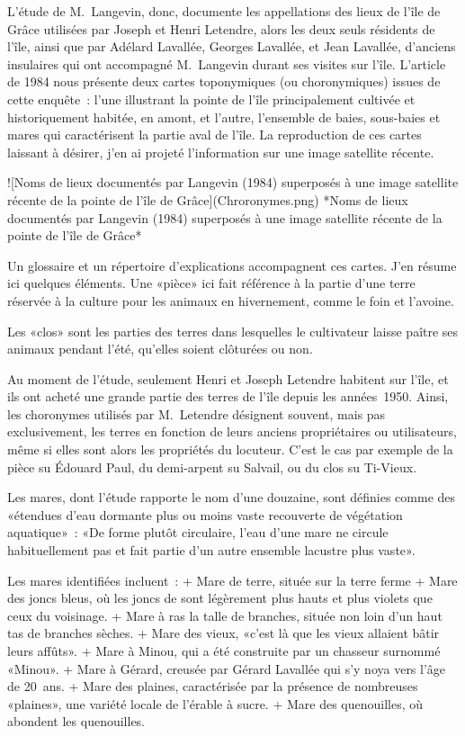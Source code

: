 \documentclass[12pt]{report}
\begin{document}
L’étude de M. Langevin, donc, documente les appellations des lieux de l’île de Grâce utilisées par Joseph et Henri Letendre, alors les deux seuls résidents de l’île, ainsi que par Adélard Lavallée, Georges Lavallée, et Jean Lavallée, d’anciens insulaires qui ont accompagné M. Langevin durant ses visites sur l’île. L’article de 1984 nous présente deux cartes toponymiques (ou choronymiques) issues de cette enquête : l’une illustrant la pointe de l’île principalement cultivée et historiquement habitée, en amont, et l’autre, l’ensemble de baies, sous-baies et mares qui caractérisent la partie aval de l’île. La reproduction de ces cartes laissant à désirer, j’en ai projeté l’information sur une image satellite récente.  


![Noms de lieux documentés par Langevin (1984) superposés à une image satellite récente de la pointe de l’île de Grâce](Chroronymes.png)  
*Noms de lieux documentés par Langevin (1984) superposés à une image satellite récente de la pointe de l’île de Grâce* 

Un glossaire et un répertoire d’explications accompagnent ces cartes. J’en résume ici quelques éléments.  
Une «pièce» ici fait référence à la partie d’une terre réservée à la culture pour les animaux en hivernement, comme le foin et l’avoine.  

Les «clos» sont les parties des terres dans lesquelles le cultivateur laisse paître ses animaux pendant l’été, qu’elles soient clôturées ou non.  

Au moment de l’étude, seulement Henri et Joseph Letendre habitent sur l’île, et ils ont acheté une grande partie des terres de l’île depuis les années 1950. Ainsi, les choronymes utilisés par M. Letendre désignent souvent, mais pas exclusivement, les terres en fonction de leurs anciens propriétaires ou utilisateurs, même si elles sont alors les propriétés du locuteur. C’est le cas par exemple de la pièce su Édouard Paul, du demi-arpent su Salvail, ou du clos su Ti-Vieux. 

Les mares, dont l’étude rapporte le nom d’une douzaine, sont définies comme des «étendues d’eau dormante plus ou moins vaste recouverte de végétation aquatique» : «De forme plutôt circulaire, l’eau d’une mare ne circule habituellement pas et fait partie d’un autre ensemble lacustre plus vaste». 

Les mares identifiées incluent :  
+ Mare de terre, située sur la terre ferme
+ Mare des joncs bleus, où les joncs de sont légèrement plus hauts et plus violets que ceux du voisinage.
+ Mare à ras la talle de branches, située non loin d’un haut tas de branches sèches.
+ Mare des vieux, «c’est là que les vieux allaient bâtir leurs affûts».
+ Mare à Minou, qui a été construite par un chasseur surnommé «Minou».
+ Mare à Gérard, creusée par Gérard Lavallée qui s’y noya vers l’âge de 20 ans.
+ Mare des plaines, caractérisée par la présence de nombreuses «plaines», une variété locale de l’érable à sucre.
+ Mare des quenouilles, où abondent les quenouilles.
\end{document}
